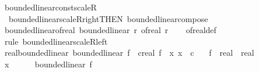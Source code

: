 \begin{isabellebody}
\isanewline
{}\isamarkupfalse%
\ bounded{\isacharunderscore}{\kern0pt}linear{\isacharunderscore}{\kern0pt}const{\isacharunderscore}{\kern0pt}scaleR\ {\isacharequal}{\kern0pt}\isanewline
\ \ bounded{\isacharunderscore}{\kern0pt}linear{\isacharunderscore}{\kern0pt}scaleR{\isacharunderscore}{\kern0pt}right{\isacharbrackleft}{\kern0pt}THEN\ bounded{\isacharunderscore}{\kern0pt}linear{\isacharunderscore}{\kern0pt}compose{\isacharbrackright}{\kern0pt}\isanewline
\isanewline
{}\isamarkupfalse%
\ bounded{\isacharunderscore}{\kern0pt}linear{\isacharunderscore}{\kern0pt}of{\isacharunderscore}{\kern0pt}real{\isacharcolon}{\kern0pt}\ {\isachardoublequoteopen}bounded{\isacharunderscore}{\kern0pt}linear\ {\isacharparenleft}{\kern0pt}{\isasymlambda}r{\isachardot}{\kern0pt}\ of{\isacharunderscore}{\kern0pt}real\ r{\isacharparenright}{\kern0pt}{\isachardoublequoteclose}\isanewline
%
\isadelimproof
\ \ %
\endisadelimproof
%
\isatagproof
{}\isamarkupfalse%
\ of{\isacharunderscore}{\kern0pt}real{\isacharunderscore}{\kern0pt}def\ \isamarkupfalse%
\ {\isacharparenleft}{\kern0pt}rule\ bounded{\isacharunderscore}{\kern0pt}linear{\isacharunderscore}{\kern0pt}scaleR{\isacharunderscore}{\kern0pt}left{\isacharparenright}{\kern0pt}%
\endisatagproof
{\isafoldproof}%
%
\isadelimproof
\isanewline
%
\endisadelimproof
\isanewline
{}\isamarkupfalse%
\ real{\isacharunderscore}{\kern0pt}bounded{\isacharunderscore}{\kern0pt}linear{\isacharcolon}{\kern0pt}\ {\isachardoublequoteopen}bounded{\isacharunderscore}{\kern0pt}linear\ f\ {\isasymlongleftrightarrow}\ {\isacharparenleft}{\kern0pt}{\isasymexists}c{\isacharcolon}{\kern0pt}{\isacharcolon}{\kern0pt}real{\isachardot}{\kern0pt}\ f\ {\isacharequal}{\kern0pt}\ {\isacharparenleft}{\kern0pt}{\isasymlambda}x{\isachardot}{\kern0pt}\ x\ {\isacharasterisk}{\kern0pt}\ c{\isacharparenright}{\kern0pt}{\isacharparenright}{\kern0pt}{\isachardoublequoteclose}\isanewline
\ \ \ f\ {\isacharcolon}{\kern0pt}{\isacharcolon}{\kern0pt}\ {\isachardoublequoteopen}real\ {\isasymRightarrow}\ real{\isachardoublequoteclose}\isanewline
%
\isadelimproof
%
\endisadelimproof
%
\isatagproof
{}\isamarkupfalse%
\ {\isacharminus}{\kern0pt}\isanewline
\ \ \isacommand{{\isacharbraceleft}{\kern0pt}}\isamarkupfalse%
\isanewline
\ \ \ \ \isamarkupfalse%
\ x\isanewline
\ \ \ \ \isamarkupfalse%
\ {\isachardoublequoteopen}bounded{\isacharunderscore}{\kern0pt}linear\ f{\isachardoublequoteclose}\isanewline
\ \ \ \ \isamarkupfalse%

\end{isabellebody}
